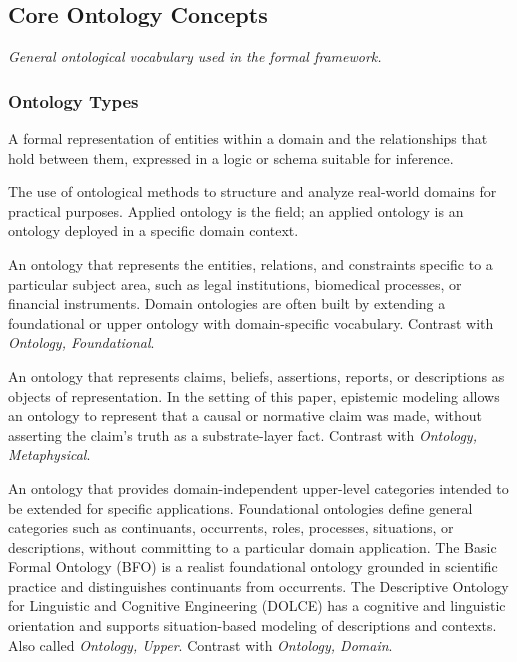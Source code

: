 \subsection*{Core Ontology Concepts}
\textit{General ontological vocabulary used in the formal framework.}

\subsubsection*{Ontology Types}

\begin{description}[style=nextline,leftmargin=1.5cm]

\item[Ontology]
A formal representation of entities within a domain
and the relationships that hold between them,
expressed in a logic or schema suitable for inference.

\item[Ontology, Applied]
The use of ontological methods to structure and analyze
real-world domains for practical purposes.
Applied ontology is the field;
an applied ontology is an ontology deployed
in a specific domain context.

\item[Ontology, Domain]
An ontology that represents the entities, relations,
and constraints specific to a particular subject area,
such as legal institutions, biomedical processes,
or financial instruments.
Domain ontologies are often built by extending
a foundational or upper ontology with domain-specific vocabulary.
Contrast with \emph{Ontology, Foundational}.

\item[Ontology, Epistemic]
An ontology that represents claims, beliefs,
assertions, reports, or descriptions as objects of representation.
In the setting of this paper,
epistemic modeling allows an ontology to represent
that a causal or normative claim was made,
without asserting the claim's truth as a substrate-layer fact.
Contrast with \emph{Ontology, Metaphysical}.

\item[Ontology, Foundational]
An ontology that provides domain-independent upper-level
categories intended to be extended for specific applications.
Foundational ontologies define general categories
such as continuants, occurrents, roles, processes,
situations, or descriptions,
without committing to a particular domain application.
The Basic Formal Ontology (BFO) is a realist foundational
ontology grounded in scientific practice and distinguishes
continuants from occurrents.
The Descriptive Ontology for Linguistic and Cognitive
Engineering (DOLCE) has a cognitive and linguistic orientation
and supports situation-based modeling of descriptions
and contexts.
Also called \emph{Ontology, Upper}.
Contrast with \emph{Ontology, Domain}.


\end{description}
